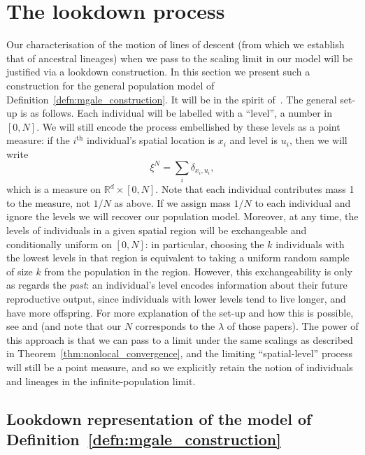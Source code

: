 \documentclass[EJP]{ejpecp} %
\newcommand{\IR}{\mathbb R}
\newcommand{\lp}{\xi}              %
\newcommand{\citet}[1]{\cite{#1}}
\begin{document}
\section{The lookdown process}
    \label{sec:lookdown}

Our characterisation of the motion of lines of descent (from which we establish
that of ancestral lineages) when we pass
to the scaling limit in our model will be justified via a lookdown construction.
In this section 
we present such a construction for the general population model 
of Definition~\ref{defn:mgale_construction}. It will be
in the spirit of~\cite{kurtz/rodrigues:2011}. 
The general set-up is as follows.
Each individual will be labelled with a ``level'', a number in $[0, N]$.
We will still encode the process embellished by these levels
as a point measure:
if the $i^\mathrm{th}$ individual's spatial location is $x_i$
and level is $u_i$, then we will write
\[
    \lp^N = \sum_i \delta_{x_i, u_i} ,
\]
which is a measure on $\IR^d \times [0, N]$.
Note that each individual contributes mass 1 to the measure,
not $1/N$ as above. If we assign mass $1/N$ to each individual and 
ignore the levels we will recover our population model. 
Moreover, at any time, the levels of 
individuals in a given spatial region 
will be exchangeable and conditionally uniform on $[0, N]$:
in particular, choosing the $k$ individuals with the lowest levels 
in that region
is equivalent to taking a uniform random sample of size $k$ 
from the population in the region.
However, this exchangeability is only as regards the \emph{past}:
an individual's level encodes information about their future reproductive output,
since individuals with lower levels tend to live longer, and have more offspring.
For more explanation of the set-up and how this is possible,
see \citet{kurtz/rodrigues:2011} and \citet{etheridge/kurtz:2019} 
(and note that our $N$ corresponds to the $\lambda$ of those papers).
The power of this approach is that we can pass to a limit under the
same scalings as described in Theorem~\ref{thm:nonlocal_convergence}, 
and 
the limiting ``spatial-level'' process will still be a point measure,
and so we explicitly retain the notion of individuals and lineages
in the infinite-population limit.


\subsection{Lookdown representation of the model of 
Definition~\ref{defn:mgale_construction}}
\label{sec:lookdown_defn}
\end{document}

